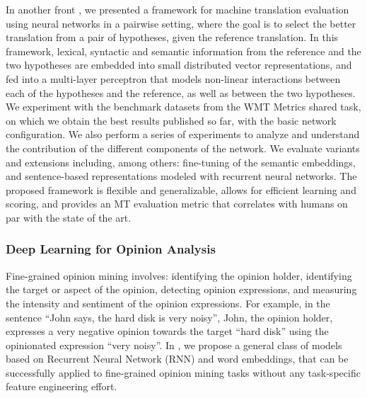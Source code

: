 \documentclass{article} %
\begin{document}
In another front \cite{guzman2015-ACL,guzman_mteval_CSL16}, we presented a framework for machine translation evaluation using neural networks in a pairwise setting, where the goal is to select the better translation from a pair of hypotheses, given the reference translation. In this framework, lexical, syntactic and semantic information from the reference and the two hypotheses are embedded into small distributed vector representations, and fed into a multi-layer perceptron that models non-linear interactions between each of the hypotheses and the reference, as well as between the two hypotheses. We experiment with the benchmark datasets from the WMT Metrics shared task, on which we obtain the best results published so far, with the basic network configuration. We also perform a series of experiments to analyze and understand the contribution of the different components of the network. We evaluate variants and extensions including, among others: fine-tuning of the semantic embeddings, and sentence-based representations modeled with recurrent neural networks. The proposed framework is flexible and generalizable, allows for efficient learning and scoring, and provides an MT evaluation metric that correlates with humans on par with the state of the art.




\subsubsection{Deep Learning for Opinion Analysis}

Fine-grained opinion mining involves: \Ni identifying the opinion holder, \Nii identifying the target or aspect of the opinion, \Niii detecting opinion expressions, and \Niv measuring the intensity and sentiment of the opinion expressions. For example, in the sentence ``John says, the hard disk is very noisy'', John, the opinion holder, expresses a very negative opinion towards the target ``hard disk'' using the opinionated expression ``very noisy''. In \cite{liu-joty-meng:2015:EMNLP}, we propose a general class of models based on Recurrent Neural Network (RNN) and word embeddings, that can be successfully applied to fine-grained opinion mining tasks without any task-specific feature engineering effort.  

\end{document}
